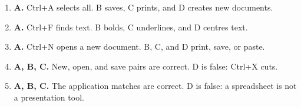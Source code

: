 \documentclass[11pt]{article}
\begin{document}
\begin{enumerate}[label=\textbf{Q\arabic*.}, leftmargin=*]
\item \textbf{A.} Ctrl+A selects all. B saves, C prints, and D creates new documents.
\item \textbf{A.} Ctrl+F finds text. B bolds, C underlines, and D centres text.
\item \textbf{A.} Ctrl+N opens a new document. B, C, and D print, save, or paste.
\item \textbf{A, B, C.} New, open, and save pairs are correct. D is false: Ctrl+X cuts.
\item \textbf{A, B, C.} The application matches are correct. D is false: a spreadsheet is not a presentation tool.
\end{enumerate}
\def\JKSSBLessonID{54}\def\JKSSBAnswers{1}
\end{document}
